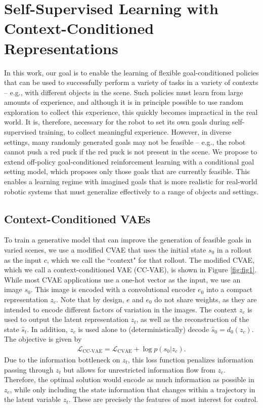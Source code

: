 \documentclass{article}
\begin{document}
\section{Self-Supervised Learning with Context-Conditioned Representations}

In this work, our goal is to enable the learning of flexible goal-conditioned policies that can be used to successfully perform a variety of tasks in a variety of contexts -- e.g., with different objects in the scene. Such policies must learn from large amounts of experience, and although it is in principle possible to use random exploration to collect this experience, this quickly becomes impractical in the real world.
It is, therefore, necessary for the robot to set its own goals during self-supervised training, to collect meaningful experience. However, in diverse settings, many randomly generated goals may not be feasible -- e.g., the robot cannot push a red puck if the red puck is not present in the scene.
We propose to extend off-policy goal-conditioned reinforcement learning with a conditional goal setting model, which proposes only those goals that are currently feasible. This enables a learning regime with imagined goals that is more realistic for real-world robotic systems that must generalize effectively to a range of objects and settings.

\subsection{Context-Conditioned VAEs}
\label{sec:ccvae}

To train a generative model that can improve the generation of feasible goals in varied scenes, we use a modified CVAE that uses the initial state $s_{0}$ in a rollout as the input $c$, which we call the ``context" for that rollout.
The modified CVAE, which we call a context-conditioned VAE (CC-VAE), is shown in Figure \ref{fig:fig1}. While most CVAE applications use a one-hot vector as the input, we use an image $s_0$. This image is encoded with a convolutional encoder $e_0$ into a compact representation $z_c$. Note that by design, $e$ and $e_0$ do not share weights, as they are intended to encode different factors of variation in the images. The context $z_c$ is used to output the latent representation $z_t$, as well as the reconstruction of the state $\hat{s}_t$. In addition, $z_c$ is used alone to (deterministically) decode $\hat{s}_0 = d_0(z_c)$. The objective is given by
\begin{align} \label{eq:cc-vae-loss}
    \mathcal L_\text{CC-VAE} = \mathcal L_\text{CVAE} + \log p(s_0|z_c).
\end{align}
Due to the information bottleneck on $z_t$, this loss function penalizes information passing through $z_t$ but allows for unrestricted information flow from $z_c$. Therefore, the optimal solution would encode as much information as possible in $z_c$, while only including the state information that changes within a trajectory in the latent variable $z_t$. These are precisely the features of most interest for control.
\end{document}
